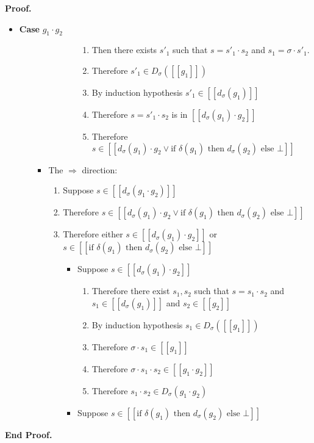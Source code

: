 \documentclass{article}
\newcommand{\interp}[1]{[\![{#1}]\!]}
\newcommand{\semderiv}[2]{D_{#1}({#2})}
\newcommand{\deriv}[2]{d_{#1}({#2})}
\newcommand{\IfThenElse}[3]{\mbox{if }{#1}\mbox{ then }{#2}\mbox{ else }{#3}}
\newcommand{\emptify}[1]{\delta({#1})}
\newenvironment{proof}{\noindent\textbf{Proof.}}{\noindent\textbf{End Proof.}}
\newenvironment{caseblock}{\begin{itemize}}{\end{itemize}}
\newenvironment{case}[1]{\item \textbf{Case} {#1}\\}{}
\begin{document}
\begin{proof}
\begin{caseblock}
\begin{case}{$g_1\cdot g_2$}
\begin{enumerate}
\begin{itemize}
\begin{enumerate}
\begin{itemize}
\begin{enumerate}
                     \item Then there exists $s'_1$ such that $s = s'_1 \cdot s_2$ and $s_1 = \sigma \cdot s'_1$. 
                     \item Therefore $s'_1 \in \semderiv{\sigma}{\interp{g_1}}$
                     \item By induction hypothesis $s'_1 \in \interp{\deriv{\sigma}{g_1}}$
                     \item Therefore $s = s'_1 \cdot s_2$ is in $\interp{\deriv{\sigma}{g_1}\cdot g_2}$
                     \item Therefore $s \in \interp{\deriv{\sigma}{g_1}\cdot g_2 \vee \IfThenElse{\emptify{g_1}}{\deriv{\sigma}{g_2}}{\bot}}$
                   \end{enumerate}
                \end{itemize}
            \end{enumerate}
          \item The $\Rightarrow$ direction: 
            \begin{enumerate}
              \item Suppose $s \in \interp{\deriv{\sigma}{g_1\cdot g_2}}$
              \item Therefore $s \in \interp{\deriv{\sigma}{g_1}\cdot g_2 \vee \IfThenElse{\emptify{g_1}}{\deriv{\sigma}{g_2}}{\bot}}$
              \item Therefore either $s \in \interp{\deriv{\sigma}{g_1}\cdot g_2}$ or 
                    $s \in \interp{\IfThenElse{\emptify{g_1}}{\deriv{\sigma}{g_2}}{\bot} }$
                \begin{itemize}
                  \item Suppose $s \in \interp{\deriv{\sigma}{g_1}\cdot g_2}$ 
                    \begin{enumerate}
                      \item Therefore there exist $s_1, s_2$ such that $s = s_1 \cdot s_2$ and 
                        $s_1 \in \interp{\deriv{\sigma}{g_1}}$ and $s_2 \in \interp{g_2}$
                      \item By induction hypothesis $s_1 \in \semderiv{\sigma}{\interp{g_1}}$
                      \item Therefore $\sigma \cdot s_1 \in \interp{g_1}$
                      \item Therefore $\sigma \cdot s_1 \cdot s_2 \in \interp{g_1 \cdot g_2}$
                      \item Therefore $s_1 \cdot s_2 \in \semderiv{\sigma}{g_1 \cdot g_2}$
                    \end{enumerate}
                  \item Suppose $s \in \interp{\IfThenElse{\emptify{g_1}}{\deriv{\sigma}{g_2}}{\bot} }$


\end{itemize}
\end{enumerate}
\end{itemize}
\end{enumerate}
\end{case}
\end{caseblock}
\end{proof}
\end{document}
